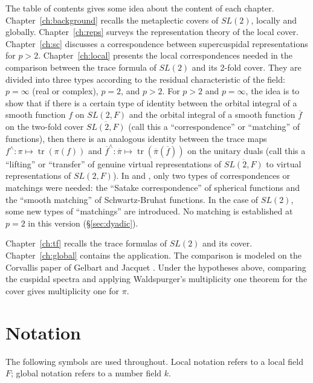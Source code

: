 \documentclass[12pt,letterpaper]{book}
\theoremstyle{plain}
\theoremstyle{definition}
\theoremstyle{remark}
\theoremstyle{remark}
\newcommand{\tr}{\operatorname{tr}}
\begin{document}
The table of contents gives some idea about the content of each chapter.
Chapter~\ref{ch:background} recalls the metaplectic covers of $SL(2)$,
locally and globally. Chapter~\ref{ch:reps} surveys the representation
theory of the local cover. Chapter~\ref{ch:sc} discusses a correspondence
between supercuspidal representations for $p>2$.
Chapter~\ref{ch:local} presents the local correspondences needed in the
comparison between the trace formula of $SL(2)$ and its 2-fold cover.
They are divided into three types according to the residual
characteristic of the field: $p=\infty$ (real or complex), $p=2$,
and $p>2$. For $p>2$ and $p=\infty$, the idea is to show that if there
is a certain type of identity between the orbital integral of a smooth
function $f$ on $SL(2,F)$ and the orbital integral of a smooth function
$\overline{f}$ on the two-fold cover $\overline{SL(2,F)}$ (call this a
``correspondence'' or ``matching'' of functions), then there is an
analogous identity between the trace maps
$f^\wedge:\pi\longmapsto \tr(\pi(f))$
and $\overline{f}^\wedge:\overline{\pi}\longmapsto
\tr(\overline{\pi}(\overline{f}))$
on the unitary duals (call this a ``lifting'' or ``transfer''
of genuine virtual representations of $\overline{SL(2,F)}$ to
virtual representations of $SL(2,F)$).
In \cite{L4} and \cite{Fl}, only two types
of correspondences or matchings were needed: the
``Satake correspondence'' of spherical functions and the
``smooth matching'' of Schwartz-Bruhat functions.
In the case of $SL(2)$, some new
types of ``matchings'' are introduced. No matching is established at
$p=2$ in this version (\S\ref{sec:dyadic}).

Chapter~\ref{ch:tf} recalls the trace formulas of $SL(2)$ and its cover.
Chapter~\ref{ch:global} contains the application. The comparison is
modeled on the Corvallis paper of Gelbart and Jacquet \cite{GJ}.
Under the hypotheses above, comparing the cuspidal spectra
and applying Waldspurger's multiplicity one theorem for the cover gives
multiplicity one for $\pi$.

\section{Notation}\label{sec:notation}

The following symbols are used throughout. Local notation refers to a
local field $F$; global notation refers to a number field $k$.
\end{document}

